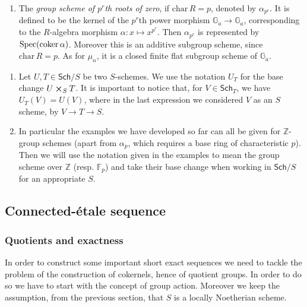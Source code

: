 \begin{ex}
\begin{enumerate}
		\item The {\em group scheme of $p^r$th roots of zero},
			if $\mathrm{char}\, R = p$, denoted by $\alpha_{p^r}$. 
			It is defined to be the kernel of the $p^r$th power
			morphism $\mathbb{G}_a \to \mathbb{G}_a$,
			corresponding to the $R$-algebra morphism
			$\alpha\colon x \mapsto x^{p^r}$.
			Then $\alpha_{p^r}$ is represented by $\mathrm{Spec}(\operatorname{coker} \alpha)$.
			Moreover this is an additive subgroup scheme, since $\mathrm{char}\, R = p$.
			As for $\mu_n$, it is a closed finite flat subgroup scheme of 
			$\mathbb{G}_a$.
	\end{enumerate}
\end{ex}


\begin{rem}\leavevmode\vspace{-\baselineskip}
\begin{enumerate}
\item 	Let $U, T \in \mathsf{Sch}/S$ be two $S$-schemes.
	We use the notation $U_T$ for the base change $U \cross_{ S } T$.
	It is important to notice that, for $V \in \mathsf{Sch}_{ T }$, we 
	have $U_T(V) = U(V)$, where in the last expression
	we considered $V$ as an $S$ scheme, by $V \to T \to S$.


\item	In particular the examples we have developed so far 
	can all be given for $\mathbb{Z}$-group schemes
	(apart from $\alpha_p$, which requires a base ring
	of characteristic $p$).
	Then we will use the notation given in the examples
	to mean the group scheme over $\mathbb{Z}$ (resp$.$ $\mathbb{F}_{p}$)
	and take their base change when working in $\mathsf{Sch}/S$
	for an appropriate $S$.
\end{enumerate}
\end{rem}


\subsection{Connected-étale sequence}
\subsubsection{Quotients and exactness}
In order to construct some important short exact sequences
we need to tackle the problem of the construction
of cokernels, hence of quotient groups.
In order to do so we have to start with the concept of group action.
Moreover we keep the assumption, from the previous section, that $S$
is a locally Noetherian scheme.

